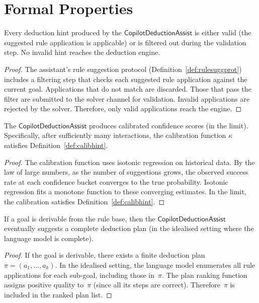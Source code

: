 \documentclass[11pt]{article}
\newcommand{\CDA}{\mathsf{CopilotDeductionAssist}}
\begin{document}
\section{Formal Properties}\label{sec:formal}

\begin{theorem}\label{thm:hintsound}
Every deduction hint produced by the $\CDA$ is either valid
(the suggested rule application is applicable) or is filtered
out during the validation step.  No invalid hint reaches the
deduction engine.
\end{theorem}
\begin{proof}
The assistant's rule suggestion protocol
(Definition~\ref{def:rulesuggprot}) includes a filtering step
that checks each suggested rule application against the current
goal.  Applications that do not match are discarded.  Those
that pass the filter are submitted to the solver channel for
validation.  Invalid applications are rejected by the solver.
Therefore, only valid applications reach the engine.
\end{proof}

\begin{theorem}\label{thm:trustcalib}
The $\CDA$ produces calibrated confidence scores (in the limit).
Specifically, after sufficiently many interactions, the
calibration function $\kappa$ satisfies
Definition~\ref{def:calibhint}.
\end{theorem}
\begin{proof}
The calibration function uses isotonic regression on historical
data.  By the law of large numbers, as the number of suggestions
grows, the observed success rate at each confidence bucket
converges to the true probability.  Isotonic regression fits
a monotone function to these converging estimates.  In the limit,
the calibration satisfies Definition~\ref{def:calibhint}.
\end{proof}

\begin{theorem}\label{thm:dedcomp}
If a goal is derivable from the rule base, then the $\CDA$
eventually suggests a complete deduction plan (in the idealised
setting where the language model is complete).
\end{theorem}
\begin{proof}
If the goal is derivable, there exists a finite deduction plan
$\pi = (a_1, \ldots, a_k)$.  In the idealised setting, the
language model enumerates all rule applications for each sub-goal,
including those in~$\pi$.  The plan ranking function assigns
positive quality to~$\pi$ (since all its steps are correct).
Therefore~$\pi$ is included in the ranked plan list.
\end{proof}
\end{document}
